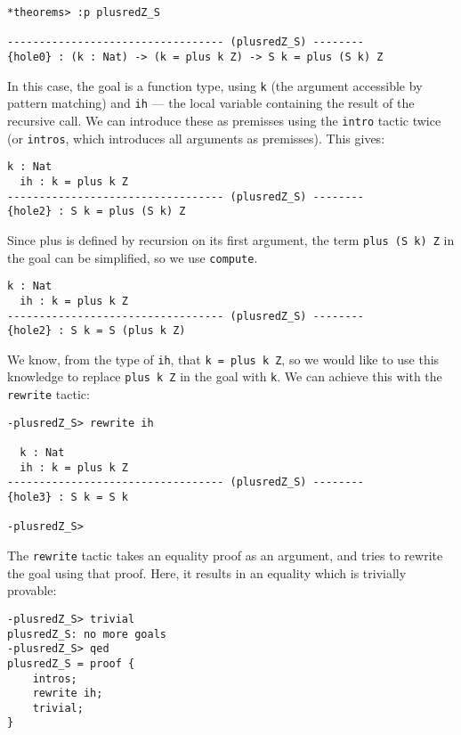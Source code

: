 \begin{lstlisting}[style=stdout]
*theorems> :p plusredZ_S

---------------------------------- (plusredZ_S) --------
{hole0} : (k : Nat) -> (k = plus k Z) -> S k = plus (S k) Z
\end{lstlisting}

\noindent
In this case, the goal is a function type, using \texttt{k} (the argument accessible by pattern matching) and \texttt{ih} --- the local variable containing the result of the recursive call.
We can introduce these as premisses using the \texttt{intro} tactic twice (or \texttt{intros}, which introduces all arguments as premisses).
This gives:

\begin{lstlisting}[style=stdout]
  k : Nat
  ih : k = plus k Z
---------------------------------- (plusredZ_S) --------
{hole2} : S k = plus (S k) Z
\end{lstlisting}

\noindent
Since plus is defined by recursion on its first argument, the term \texttt{plus (S k) Z} in the goal can be simplified, so we use \texttt{compute}.

\begin{lstlisting}[style=stdout]
  k : Nat
  ih : k = plus k Z
---------------------------------- (plusredZ_S) --------
{hole2} : S k = S (plus k Z)
\end{lstlisting}

\noindent
We know, from the type of \texttt{ih}, that \texttt{k = plus k Z}, so we would like to use this knowledge to replace \texttt{plus k Z} in the goal with \texttt{k}.
We can achieve this with the \texttt{rewrite} tactic:

\begin{lstlisting}[style=stdout]
-plusredZ_S> rewrite ih

  k : Nat
  ih : k = plus k Z
---------------------------------- (plusredZ_S) --------
{hole3} : S k = S k

-plusredZ_S>
\end{lstlisting}

\noindent
The \texttt{rewrite} tactic takes an equality proof as an argument, and tries to rewrite the goal using that proof. Here, it results in an equality which is trivially provable:

\begin{lstlisting}[style=stdout]
-plusredZ_S> trivial
plusredZ_S: no more goals
-plusredZ_S> qed
plusredZ_S = proof {
    intros;
    rewrite ih;
    trivial;
}
\end{lstlisting}

